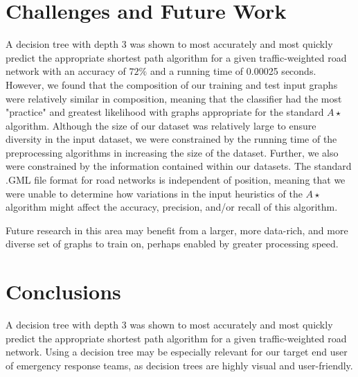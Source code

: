 \documentclass{article}
\begin{document}
\section{Challenges and Future Work}

A decision tree with depth 3 was shown to most accurately and most quickly predict the appropriate shortest path algorithm for a given traffic-weighted road network with an accuracy of $72\%$ and a running time of 0.00025 seconds. However, we found that the composition of our training and test input graphs were relatively similar in composition, meaning that the classifier had the most "practice" and greatest likelihood with graphs appropriate for the standard $A\star$ algorithm. Although the size of our dataset was relatively large to ensure diversity in the input dataset, we were constrained by the running time of the preprocessing algorithms in increasing the size of the dataset. Further, we also were constrained by the information contained within our datasets. The standard .GML file format for road networks is independent of position, meaning that we were unable to determine how variations in the input heuristics of the $A\star$ algorithm might affect the accuracy, precision, and/or recall of this algorithm.

Future research in this area may benefit from a larger, more data-rich, and more diverse set of graphs to train on, perhaps enabled by greater processing speed. 

\section{Conclusions}

A decision tree with depth 3 was shown to most accurately and most quickly predict the appropriate shortest path algorithm for a given traffic-weighted road network. Using a decision tree may be especially relevant for our target end user of emergency response teams, as decision trees are highly visual and user-friendly. 



\end{document}
